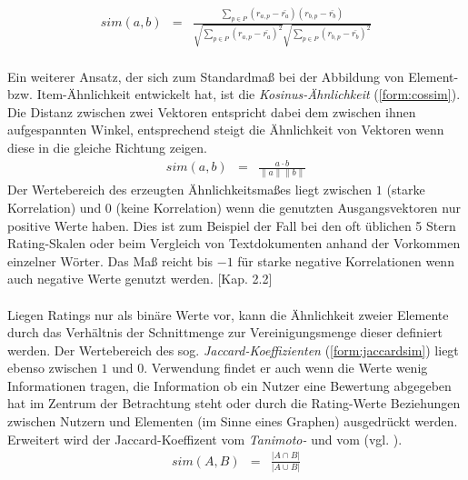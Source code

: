 \begin{align}
\label{form:pearsonsim}
sim(a,b) & = & \frac{\sum_{p \in P} (r_{a,p}-\bar{r_a})(r_{b,p}-\bar{r_b})}{\sqrt{\sum_{p \in P} (r_{a,p}-\bar{r_a})^2 }\sqrt{\sum_{p \in P} (r_{b,p}-\bar{r_b})^2 }}
\end{align}

\paragraph{} Ein weiterer Ansatz, der sich zum Standardmaß bei der Abbildung von Element- bzw. Item-Ähnlichkeit entwickelt hat, ist die \textit{Kosinus-Ähnlichkeit} (\ref{form:cossim}). Die Distanz zwischen zwei Vektoren entspricht dabei dem zwischen ihnen aufgespannten Winkel, entsprechend steigt die Ähnlichkeit von Vektoren wenn diese in die gleiche Richtung zeigen. 
\begin{align}
\label{form:cossim}
sim(a,b) & = & \frac{a \cdot b}{\|a\| \|b\|}
\end{align}
Der Wertebereich des erzeugten Ähnlichkeitsmaßes liegt zwischen $1$ (starke Korrelation) und $0$ (keine Korrelation) wenn die genutzten Ausgangsvektoren nur positive Werte haben. Dies ist zum Beispiel der Fall bei den oft üblichen 5 Stern Rating-Skalen oder beim Vergleich von Textdokumenten anhand der Vorkommen einzelner Wörter. Das Maß reicht bis $-1$ für starke negative Korrelationen wenn auch negative Werte genutzt werden. \citep{rs}[Kap. 2.2]

\paragraph{} Liegen Ratings nur als binäre Werte vor, kann die Ähnlichkeit zweier Elemente durch das Verhältnis der Schnittmenge zur Vereinigungsmenge dieser definiert werden. Der Wertebereich des sog. \textit{Jaccard-Koeffizienten} (\ref{form:jaccardsim}) liegt ebenso zwischen $1$ und $0$. Verwendung findet er auch wenn die Werte wenig Informationen tragen, die Information ob ein Nutzer eine Bewertung abgegeben hat im Zentrum der Betrachtung steht oder durch die Rating-Werte Beziehungen zwischen Nutzern und Elementen (im Sinne eines Graphen) ausgedrückt werden. Erweitert wird der Jaccard-Koeffizent vom \textit{Tanimoto-} und vom \textit{} (vgl. \citep{Bogers09collaborativeand}). \citep[Kap. 3.1]{rs} \citep{pci}
\begin{align}
\label{form:jaccardsim}
sim(A,B) & = & \frac{|A \cap B|}{|A \cup B|}
\end{align}

